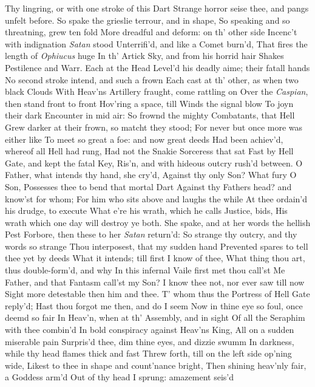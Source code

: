 \documentclass[11pt]{book}
\newcounter {first}
\begin{document}
Thy lingring, or with one stroke of this Dart 
Strange horror seise thee, and pangs unfelt before. 
\quad So spake the grieslie terrour, and in shape, 
So speaking and so threatning, grew ten fold 
More dreadful and deform: on th' other side 
Incenc't with indignation \textit{Satan} stood 
Unterrifi'd, and like a Comet burn'd, 
That fires the length of \textit{Ophiucus} huge 
In th' Artick Sky, and from his horrid hair 
Shakes Pestilence and Warr.  Each at the Head 
Level'd his deadly aime; their fatall hands 
No second stroke intend, and such a frown 
Each cast at th' other, as when two black Clouds 
With Heav'ns Artillery fraught, come rattling on 
Over the \textit{Caspian}, then stand front to front 
Hov'ring a space, till Winds the signal blow 
To joyn their dark Encounter in mid air: 
So frownd the mighty Combatants, that Hell 
Grew darker at their frown, so matcht they stood; 
For never but once more was either like 
To meet so great a foe: and now great deeds 
Had been achiev'd, whereof all Hell had rung, 
Had not the Snakie Sorceress that sat 
Fast by Hell Gate, and kept the fatal Key, 
Ris'n, and with hideous outcry rush'd between. 
\quad O Father, what intends thy hand, she cry'd, 
Against thy only Son?  What fury O Son, 
Possesses thee to bend that mortal Dart 
Against thy Fathers head? and know'st for whom; 
For him who sits above and laughs the while 
At thee ordain'd his drudge, to execute 
What e're his wrath, which he calls Justice, bids, 
His wrath which one day will destroy ye both. 
\quad She spake, and at her words the hellish Pest 
Forbore, then these to her \textit{Satan} return'd: 
\quad So strange thy outcry, and thy words so strange 
Thou interposest, that my sudden hand 
Prevented spares to tell thee yet by deeds 
What it intends; till first I know of thee, 
What thing thou art, thus double-form'd, and why 
In this infernal Vaile first met thou call'st 
Me Father, and that Fantasm call'st my Son? 
I know thee not, nor ever saw till now 
Sight more detestable then him and thee. 
\quad T' whom thus the Portress of Hell Gate reply'd; 
Hast thou forgot me then, and do I seem 
Now in thine eye so foul, once deemd so fair 
In Heav'n, when at th' Assembly, and in sight 
Of all the Seraphim with thee combin'd 
In bold conspiracy against Heav'ns King, 
All on a sudden miserable pain 
Surpris'd thee, dim thine eyes, and dizzie swumm 
In darkness, while thy head flames thick and fast 
Threw forth, till on the left side op'ning wide, 
Likest to thee in shape and count'nance bright, 
Then shining heav'nly fair, a Goddess arm'd 
Out of thy head I sprung: amazement seis'd 
\end{document}
